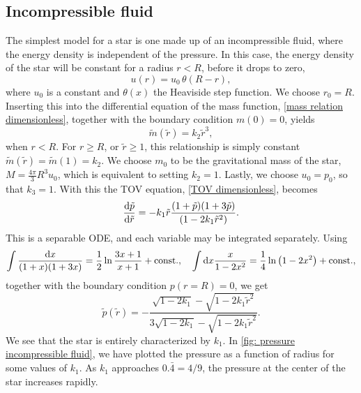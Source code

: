 \subsection{Incompressible fluid}

The simplest model for a star is one made up of an incompressible fluid, where the energy density is independent of the pressure.
In this case, the energy density of the star will be constant for a radius $r < R$, before it drops to zero,
%
\begin{equation}
    u(r) = u_0 \, \theta (R- r),
\end{equation}
%
where $u_0$ is a constant and $\theta(x)$ the Heaviside step function.
We choose $r_0 = R$.
Inserting this into the differential equation of the mass function, \autoref{mass relation dimensionless}, together with the boundary condition $m(0) = 0$, yields
%
\begin{equation}
    \tilde m(\tilde r) = k_2 \tilde r^3,
\end{equation}
%
when $r < R$.
For $r \geq R$, or $\tilde r \geq 1$, this relationship is simply constant $\tilde m(\tilde r) = \tilde m(1) = k_2$.
We choose $m_0$ to be the gravitational mass of the star, $M = \frac{4 \pi }{3} R^3 u_0$, which is equivalent to setting $k_2 = 1$.
Lastly, we choose $u_0 = p_0$, so that $k_3 = 1$.
With this the TOV equation, \autoref{TOV dimensionless}, becomes
%
\begin{equation} 
    \odv{\tilde p}{\tilde r} 
    = - k_1 \tilde r 
    \frac{(1 + \tilde p)(1 + 3 \tilde p)}{(1 - 2 k_1 \tilde r^2)}.
\end{equation}
%
This is a separable ODE, and each variable may be integrated separately.
Using
%
\begin{align}
    \int \frac{\dd x}{(1 + x)(1 + 3x)}
    = \frac{1}{2} \ln \frac{3x + 1}{x + 1} + \mathrm{const.} , \quad
    \int \dd x \frac{x}{1 - 2 x^2} 
    = \frac{1}{4}\ln\left(1 - 2 x^2 \right)
    + \mathrm{const.},
\end{align}
%
together with the boundary condition $p(r = R) = 0$, we get 
%
\begin{equation}
    \label{pressure afo r incompressible}
    \tilde p(\tilde r) 
    = 
    - \frac{\sqrt{1 - 2 k_1} - \sqrt{1 - 2 k_1 \tilde r^2}}
    {3 \sqrt{1 - 2 k_1 } - \sqrt{1 - 2 k_1 \tilde r^2}}.
\end{equation}
%
We see that the star is entirely characterized by $k_1$.
In \autoref{fig: pressure incompressible fluid}, we have plotted the pressure as a function of radius for some values of $k_1$.
As $k_1$ approaches $0.\bar 4 = 4/9$, the pressure at the center of the star increases rapidly.
